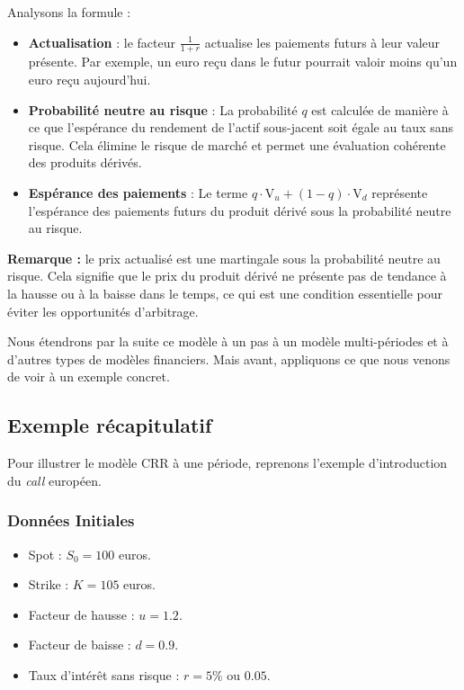 \documentclass[12pt,a4paper]{article}
\begin{document}
Analysons la formule :

\begin{itemize}
    \item \textbf{Actualisation} : le facteur \(\frac{1}{1 + r}\) actualise les paiements futurs à leur valeur présente. Par exemple, un euro reçu dans le futur pourrait valoir moins qu'un euro reçu aujourd'hui.
    \item \textbf{Probabilité neutre au risque} : La probabilité \( q \) est calculée de manière à ce que l'espérance du rendement de l'actif sous-jacent soit égale au taux sans risque. Cela élimine le risque de marché et permet une évaluation cohérente des produits dérivés.
    \item \textbf{Espérance des paiements} : Le terme \( q \cdot \text{V}_u + (1 - q) \cdot \text{V}_d \) représente l'espérance des paiements futurs du produit dérivé sous la probabilité neutre au risque.

\end{itemize}
\textbf{Remarque :} le prix actualisé est une martingale sous la probabilité neutre au risque. Cela signifie que le prix du produit dérivé ne présente pas de tendance à la hausse ou à la baisse dans le temps, ce qui est une condition essentielle pour éviter les opportunités d'arbitrage.

\vspace{0.5cm}

Nous étendrons par la suite ce modèle à un pas à un modèle multi-périodes et à d'autres types de modèles financiers. Mais avant, appliquons ce que nous venons de voir à un exemple concret.

\subsection{Exemple récapitulatif}
Pour illustrer le modèle CRR à une période, reprenons l'exemple d'introduction du \textit{call} européen.

\subsubsection{Données Initiales}
\begin{itemize}
    \item Spot : \( S_0 = 100 \) euros.
    \item Strike : \( K = 105 \) euros.
    \item Facteur de hausse : \( u = 1.2 \).
    \item Facteur de baisse : \( d = 0.9 \).
    \item Taux d'intérêt sans risque : \( r = 5\% \) ou \( 0.05 \).
\end{itemize}
\end{document}
